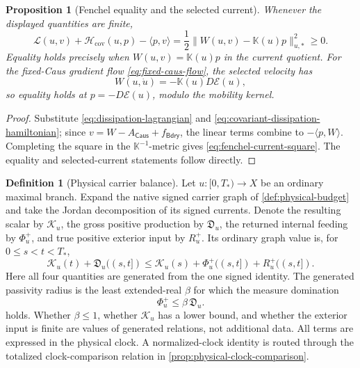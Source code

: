 \documentclass[11pt]{article}
\numberwithin{section}{part}
\theoremstyle{plain}
\newtheorem{proposition}[proposition]{Proposition}
\theoremstyle{definition}
\newtheorem{definition}[definition]{Definition}
\theoremstyle{remark}
\newcommand{\Caus}{\mathsf{Caus}}
\newcommand{\Bdry}{\mathsf{Bdry}}
\newcommand{\Energy}{\mathcal E}
\begin{document}
\begin{proposition}[Fenchel equality and the selected current]
\label{prop:fenchel-selected-current}
Whenever the displayed quantities are finite,
\begin{equation}
 \label{eq:fenchel-current-square}
 \mathscr L(u,v)+\mathscr H_{\mathrm{cov}}(u,p)-\langle p,v\rangle
 =\frac12\|W(u,v)-\mathbb K(u)p\|_{u,*}^2\ge0.
\end{equation}
Equality holds precisely when
\(W(u,v)=\mathbb K(u)p\) in the current quotient.  For the fixed-Caus
gradient flow \eqref{eq:fixed-caus-flow}, the selected velocity has
\[
 W(u,\dot u)=-\mathbb K(u)D\Energy(u),
 \]
so equality holds at \(p=-D\Energy(u)\), modulo the mobility kernel.
\end{proposition}

\begin{proof}
Substitute \eqref{eq:dissipation-lagrangian} and
\eqref{eq:covariant-dissipation-hamiltonian}; since
\(v=W-A_{\Caus}+f_{\Bdry}\), the linear terms combine to
\(-\langle p,W\rangle\).  Completing the square in the
\(\mathbb K^{-1}\)-metric gives \eqref{eq:fenchel-current-square}.  The
equality and selected-current statements follow directly.
\end{proof}

\begin{definition}[Physical carrier balance]
\label{def:physical-carrier-balance}
Let \(u:[0,T_*)\to X\) be an ordinary maximal branch.  Expand the native
signed carrier graph of \cref{def:physical-budget} and take the Jordan
decomposition of its signed currents.  Denote the resulting scalar by
\(\mathcal K_u\), the gross positive production by \(\mathfrak D_u\), the
returned internal feeding by \(\Phi_u^+\), and true positive exterior input
by \(R_u^+\).  Its ordinary graph value is, for \(0\le s<t<T_*\),
\begin{equation}
 \label{eq:physical-carrier-balance}
 \mathcal K_u(t)+\mathfrak D_u((s,t])
 \le
 \mathcal K_u(s)+\Phi_u^+((s,t])+R_u^+((s,t]).
\end{equation}
Here all four quantities are generated from the one signed identity.  The
generated passivity radius is the least extended-real \(\beta\) for which the
measure domination
\begin{equation}
 \label{eq:physical-passivity-domination}
 \Phi_u^+\le\beta\,\mathfrak D_u.
\end{equation}
holds.  Whether \(\beta\le1\), whether \(\mathcal K_u\) has a lower bound,
and whether the exterior input is finite are values of generated relations,
not additional data.  All terms are expressed in the physical clock.  A normalized-clock identity
is routed through the totalized clock-comparison relation in
\cref{prop:physical-clock-comparison}.
\end{definition}
\end{document}
